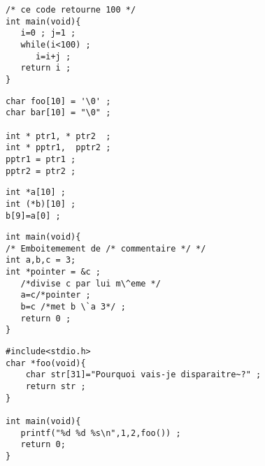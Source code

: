 \begin{frame}[fragile]
\begin{verbatim}
/* ce code retourne 100 */
int main(void){
   i=0 ; j=1 ;
   while(i<100) ;
      i=i+j ;
   return i ;
}
\end{verbatim}
\end{frame}
\begin{frame}[fragile]
\begin{verbatim}
char foo[10] = '\0' ;
char bar[10] = "\0" ;

int * ptr1, * ptr2  ; 
int * pptr1,  pptr2 ;
pptr1 = ptr1 ;
pptr2 = ptr2 ;
\end{verbatim}
\end{frame}
\begin{frame}[fragile]
\begin{verbatim}
int *a[10] ;
int (*b)[10] ;
b[9]=a[0] ;
\end{verbatim}
\end{frame}
\begin{frame}[fragile]
\begin{verbatim}
int main(void){
/* Emboitemement de /* commentaire */ */
int a,b,c = 3;
int *pointer = &c ;
   /*divise c par lui m\^eme */
   a=c/*pointer ;
   b=c /*met b \`a 3*/ ;
   return 0 ;
}
\end{verbatim}
\end{frame}
\begin{frame}[fragile]
\begin{verbatim}
#include<stdio.h>
char *foo(void){
    char str[31]="Pourquoi vais-je disparaitre~?" ;
    return str ;
}

int main(void){
   printf("%d %d %s\n",1,2,foo()) ;
   return 0;
}
\end{verbatim}
\end{frame}
